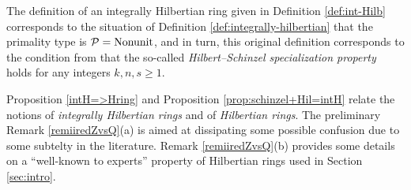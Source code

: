 \documentclass[11pt,a4paper,reqno]{amsart}
\theoremstyle{definition}
\begin{document}
The definition of an integrally Hilbertian ring given in Definition \ref{def:int-Hilb} corresponds to the situation of Definition \ref{def:integrally-hilbertian} that the primality type is ${\mathcal P}={\rm Nonunit}$, and in turn, this original definition corresponds to the condition from \cite{BDKN22} that the so-called \emph{Hilbert--Schinzel specialization property} holds for any integers $k,n,s \geq 1$.
\vskip 1mm

Proposition \ref{intH=>Hring} and Proposition \ref{prop:schinzel+Hil=intH} relate the notions of \emph{integrally Hilbertian rings} and of \emph{Hilbertian rings}.
The preliminary Remark \ref{remiiredZvsQ}(a) is aimed at dissipating some  possible confusion due to some subtelty in the literature. Remark \ref{remiiredZvsQ}(b) provides some details on a ``well-known to experts'' property of Hilbertian rings used in Section \ref{sec:intro}.
\end{document}
